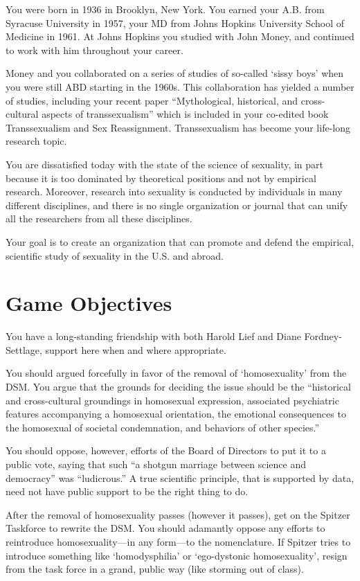 \begin{refsection}
You were born in 1936 in Brooklyn, New York. You earned your A.B. from Syracuse University in 1957, your MD from Johns Hopkins University School of Medicine in 1961. At Johns Hopkins you studied with John Money, and continued to work with him throughout your career.

Money and you collaborated on a series of studies of so-called `sissy boys' when you were still ABD starting in the 1960s. This collaboration has yielded a number of studies, including your recent paper ``Mythological, historical, and cross-cultural aspects of transsexualism'' which is included in your co-edited book Transsexualism and Sex Reassignment. Transsexualism has become your life-long research topic.

You are dissatisfied today with the state of the science of sexuality, in part because it is too dominated by theoretical positions and not by empirical research. Moreover, research into sexuality is conducted by individuals in many different disciplines, and there is no single organization or journal that can unify all the researchers from all these disciplines.

Your goal is to create an organization that can promote and defend the empirical, scientific study of sexuality in the U.S. and abroad.

\section{Game Objectives}
\label{gameobjectives}

You have a long-standing friendship with both Harold Lief and Diane Fordney-Settlage, support here when and where appropriate.

You should argued forcefully in favor of the removal of `homosexuality' from the DSM. You argue that the grounds for deciding the issue should be the ``historical and cross-cultural groundings in homosexual expression, associated psychiatric features accompanying a homosexual orientation, the emotional consequences to the homosexual of societal condemnation, and behaviors of other species.''

You should oppose, however, efforts of the Board of Directors to put it to a public vote, saying that such ``a shotgun marriage between science and democracy'' was ``ludicrous.'' A true scientific principle, that is supported by data, need not have public support to be the right thing to do.

After the removal of homosexuality passes (however it passes), get on the Spitzer Taskforce to rewrite the DSM. You should adamantly oppose any efforts to reintroduce homosexuality---in any form---to the nomenclature. If Spitzer tries to introduce something like `homodysphilia' or `ego-dystonic homosexuality', resign from the task force in a grand, public way (like storming out of class).


\end{refsection}
